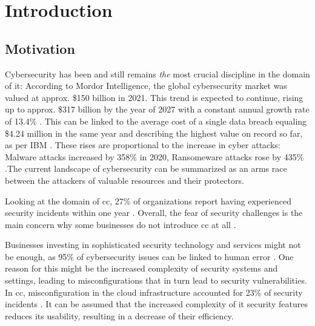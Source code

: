 
\chapter{Introduction}
\label{ch:intro}

\section{Motivation} \label{sec:intro-motivation}

Cybersecurity has been and still remains \textit{the} most crucial discipline in the domain of \Ac{it}: According to Mordor Intelligence, the global cybersecurity market was valued at approx. \$150 billion in 2021. This trend is expected to continue, rising up to approx. \$317 billion by the year of 2027 with a constant annual growth rate of 13.4\% \cite{noauthor_cybersecurity_2022}. This can be linked to the average cost of a single data breach equaling \$4.24 million in the same year and describing the highest value on record so far, as per IBM \cite{noauthor_cost_2022}. These rises are proportional to the increase in cyber attacks: Malware attacks increased by 358\% in 2020, Ransomeware attacks rose by 435\% \cite{noauthor_malware_2021}.The current landscape of cybersecurity can be summarized as an arms race between the attackers of valuable resources and their protectors. 

Looking at the domain of \ac{cc}, 27\% of organizations report having experienced security incidents within one year \cite{schulze_cloud_2022}. Overall, the fear of security challenges is the main concern why some businesses do not introduce \ac{cc} at all \cite{noauthor_2021_2021, noauthor_2022_2022}.

Businesses investing in sophisticated security technology and services might not be enough, as 95\% of cybersecurity issues can be linked to human error \cite{mee_after_2020}. One reason for this might be the increased complexity of security systems and settings, leading to misconfigurations that in turn lead to security vulnerabilities. In \ac{cc}, misconfiguration in the cloud infrastructure accounted for 23\% of security incidents \cite{schulze_cloud_2022}. It can be assumed that the increased complexity of \ac{it} security features reduces its usability, resulting in a decrease of their efficiency.

